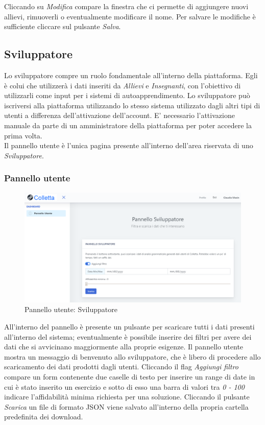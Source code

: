         	
Cliccando su \textit{Modifica} compare la finestra che ci permette di aggiungere nuovi allievi, rimuoverli o eventualmente modificare il nome. Per salvare le modifiche è sufficiente cliccare sul pulsante \textit{Salva}.
        
	\newpage
    \subsection{Sviluppatore}
    Lo sviluppatore compre un ruolo fondamentale all'interno della piattaforma. Egli è colui che utilizzerà i dati inseriti da \textit{Allievi} e \textit{Insegnanti}, con l'obiettivo di utilizzarli come input per i sistemi di autoapprendimento.
    Lo sviluppatore può iscriversi alla piattaforma utilizzando lo stesso sistema utilizzato dagli altri tipi di utenti a differenza dell'attivazione dell'account. E' necessario l'attivazione manuale da parte di un amministratore della piattaforma per poter accedere la prima volta. 
        	 \\Il pannello utente è l'unica pagina presente all'interno dell'area riservata di uno \textit{Sviluppatore}.
   
    	\subsubsection{Pannello utente}
    				\begin{figure}[H]
				\centering
				\includegraphics[width=17cm]{sez/img/sviluppatore/panelloutente.PNG}
				\caption{Pannello utente: Sviluppatore}\label{fig:1}
			\end{figure}
			 All'interno del pannello è presente un pulsante per scaricare tutti i dati presenti all'interno del sistema; eventualmente è possibile inserire dei filtri per avere dei dati che si avvicinano maggiormente alla proprie esigenze.
    	  Il pannello utente mostra un messaggio di benvenuto allo sviluppatore, che è libero di procedere allo scaricamento dei dati prodotti dagli utenti.
    	 Cliccando il flag \textit{Aggiungi filtro} compare un form contenente due caselle di testo per inserire un range di date in cui è stato inserito un esercizio e sotto di esso una barra di valori tra \textit{0 - 100} indicare l'affidabilità minima richiesta per una soluzione.
    	 Cliccando il pulsante \textit{Scarica} un file di formato JSON viene salvato all'interno della propria cartella predefinita dei download.

